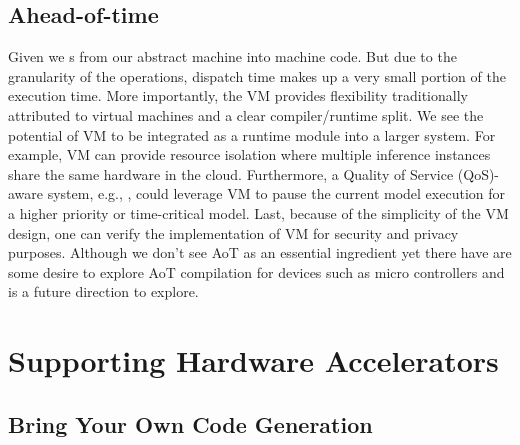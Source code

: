 
\subsection{Ahead-of-time}

Given we s from our abstract machine into machine code.
But due to the granularity of the operations, dispatch time makes
  up a very small portion of the execution time.
More importantly, the VM provides flexibility traditionally attributed
  to virtual machines and a clear compiler/runtime split.
We see the potential of VM to be integrated as a runtime module into a larger system.
For example, VM can provide resource isolation where multiple inference
  instances share the same hardware in the cloud.
Furthermore, a Quality of Service (QoS)-aware system, e.g., \citep{kang2018hotmobile, Yachir2009rsj},
  could leverage VM to pause the current model execution for a higher priority or time-critical model.
Last, because of the simplicity of the VM design, one can verify the implementation of VM for security and privacy purposes.
Although we don't see AoT as an essential ingredient yet there have are some desire to explore AoT
  compilation for devices such as micro controllers and is a future direction to explore.



\section{Supporting Hardware Accelerators}
\label{sec:accel}

\subsection{Bring Your Own Code Generation}
\label{sec:byoc}

